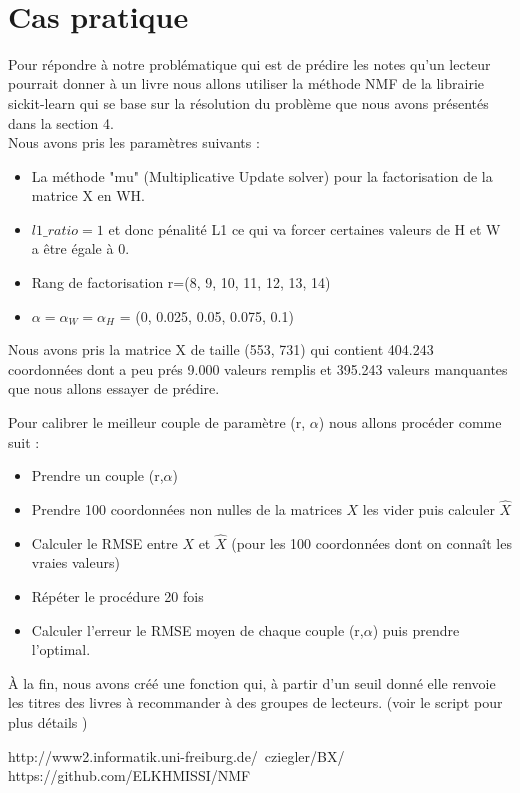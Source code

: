 \documentclass[12pt,letterpaper,twocolumn]{article}
\begin{document}
\\

\section{Cas pratique}
\justify  

Pour répondre à notre problématique qui est de prédire les notes qu'un lecteur pourrait donner à un livre nous allons utiliser la méthode NMF de la librairie sickit-learn qui se base sur la résolution du problème que nous avons présentés dans la section 4.\\
Nous avons pris les paramètres suivants : 

\begin{itemize}[label=\textbullet ]
    \item La méthode  "mu" (Multiplicative Update solver) pour la factorisation de la matrice X en WH. 
    \item  $l1\_ratio=1$ et donc pénalité L1 ce qui va forcer certaines valeurs de H et W a être égale à 0.
    \item  Rang de factorisation r=(8, 9, 10, 11, 12, 13, 14)
    \item $\alpha=\alpha_W = \alpha_H$ = (0, 0.025, 0.05, 0.075, 0.1)
\end{itemize}

Nous avons pris la matrice X de taille (553, 731) qui contient 404.243 coordonnées dont a peu prés 9.000 valeurs remplis et 395.243 valeurs manquantes que nous allons essayer de prédire.

Pour calibrer le meilleur couple de paramètre (r, $\alpha$) nous allons procéder comme suit :

\begin{itemize}[label=\textbullet ]
    \item Prendre un couple (r,$\alpha$)
    \item  Prendre 100 coordonnées non nulles de la matrices $X$ les vider puis calculer $\widehat{X}$
    \item  Calculer le RMSE entre $X$ et $\widehat{X}$ (pour les 100 coordonnées dont on connaît les vraies valeurs)
    \item Répéter le procédure 20 fois
    \item Calculer l'erreur le RMSE moyen de chaque couple (r,$\alpha$) puis prendre l'optimal.
\end{itemize}

À la fin, nous avons créé une fonction qui, à partir d'un seuil donné elle renvoie les titres des livres à recommander à des groupes de lecteurs. (voir le script pour plus détails \cite{Site2})


\begin{thebibliography}{9}
 http://www2.informatik.uni-freiburg.de/~cziegler/BX/
 https://github.com/ELKHMISSI/NMF
\end{thebibliography} 
\end{document}
